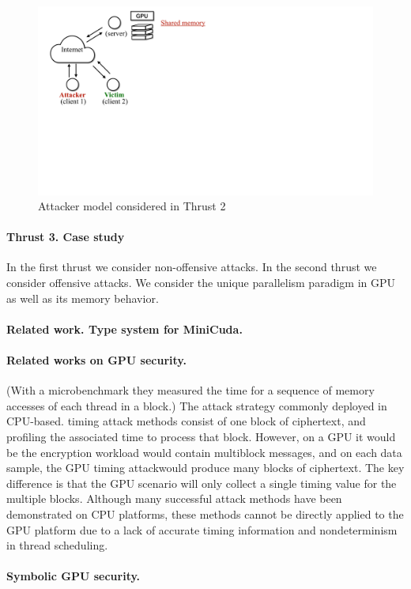 \begin{figure}[h]
    \centering
    \includegraphics[clip,trim=0 17cm 10cm 0cm,width=0.72\pdfpagewidth]{figs/thrust2-fig.pdf}
    \caption{Attacker model considered in Thrust 2 }
    \label{fig:th2-attack}
    \end{figure}


\paragraph{Thrust 3. Case study}


In the first thrust we consider non-offensive attacks.
%
In the second thrust we consider offensive attacks.
%
We consider the unique parallelism paradigm in GPU as well as its memory behavior.

\paragraph{Related work. Type system for MiniCuda.}

\paragraph{Related works on GPU security.}
(With a microbenchmark they measured the
time for a sequence of memory accesses of each thread in a block.)
%
The attack strategy commonly deployed in CPU-based. timing attack methods consist of one block of ciphertext, and profiling the associated time to process that
block. However, on a GPU it would be the encryption workload would contain multiblock messages, and on each data sample, the GPU
timing attackwould produce many blocks of ciphertext.
The key difference is that the GPU scenario will only
collect a single timing value for the multiple blocks.
Although many successful attack methods have been
demonstrated on CPU platforms, these methods cannot be directly applied to the GPU platform due to a
lack of accurate timing information and nondeterminism in thread scheduling.

\paragraph{Symbolic GPU security.}


